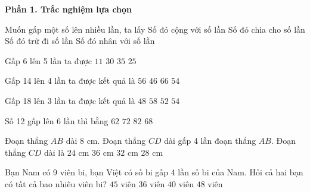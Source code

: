 \textbf{Phần 1. Trắc nghiệm lựa chọn}

\begin{ex} %
Muốn gấp một số lên nhiều lần, ta lấy
\choice
{Số đó cộng với số lần}
{Số đó chia cho số lần}
{Số đó trừ đi số lần}
{\True Số đó nhân với số lần}
\end{ex}

\begin{ex} %
Gấp 6 lên 5 lần ta được
\choice
{$11$}
{\True $30$}
{$35$}
{$25$}
\end{ex}

\begin{ex} %
Gấp 14 lên 4 lần ta được kết quả là
\choice
{\True $56$}
{$46$}
{$66$}
{$54$}
\end{ex}

\begin{ex} %
Gấp 18 lên 3 lần ta được kết quả là
\choice
{$48$}
{$58$}
{$52$}
{\True $54$}
\end{ex}

\begin{ex} %
Số 12 gấp lên 6 lần thì bằng
\choice
{$62$}
{\True $72$}
{$82$}
{$68$}
\end{ex}

\begin{ex} %
Đoạn thẳng $AB$ dài $8\text{ cm}$. Đoạn thẳng $CD$ dài gấp 4 lần đoạn thẳng $AB$. Đoạn thẳng $CD$ dài là
\choice
{$24\text{ cm}$}
{$36\text{ cm}$}
{\True $32\text{ cm}$}
{$28\text{ cm}$}
\end{ex}

\begin{ex} %
Bạn Nam có 9 viên bi, bạn Việt có số bi gấp 4 lần số bi của Nam. Hỏi cả hai bạn có tất cả bao nhiêu viên bi?
\choice
{\True $45$ viên}
{$36$ viên}
{$40$ viên}
{$48$ viên}
\end{ex}

